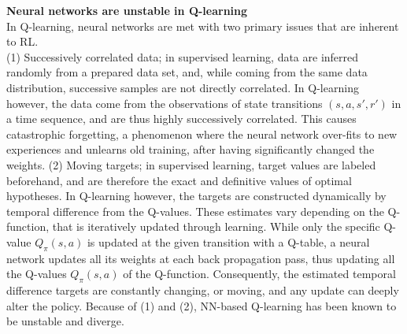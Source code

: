 \textbf{Neural networks are unstable in Q-learning} \\
In Q-learning, neural networks are met with two primary issues that are inherent to RL. \\
(1) Successively correlated data; in supervised learning, data are inferred randomly from a prepared data set, and, while coming from the same data distribution, successive samples are not directly correlated. In Q-learning however, the data come from the observations of state transitions $(s,a,s',r')$ in a time sequence, and are thus highly successively correlated. This causes catastrophic forgetting, a phenomenon where the neural network over-fits to new experiences and unlearns old training, after having significantly changed the weights.
(2) Moving targets; in supervised learning, target values are labeled beforehand, and are therefore the exact and definitive values of optimal hypotheses. In Q-learning however, the targets are constructed dynamically by temporal difference from the Q-values. These estimates vary depending on the Q-function, that is iteratively updated through learning. While only the specific Q-value $Q_{\pi}(s,a)$ is updated at the given transition with a Q-table, a neural network updates all its weights at each back propagation pass, thus updating all the Q-values $Q_{\pi}(s,a)$ of the Q-function. Consequently, the estimated temporal difference targets are constantly changing, or moving, and any update can deeply alter the policy.
Because of (1) and (2), NN-based Q-learning has been known to be unstable and diverge. \\

